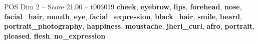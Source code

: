 \begin{textsample}{POS Dim 2 – Score 21.00 – t006019}  \label{ex:f2_pos_021}
\textbf{cheek}, \textbf{eyebrow}, \textbf{lips}, \textbf{forehead}, \textbf{nose}, \textbf{facial\_hair}, \textbf{mouth}, \textbf{eye}, \textbf{facial\_expression}, \textbf{black\_hair}, \textbf{smile}, \textbf{beard}, \textbf{portrait\_photography}, \textbf{happiness}, \textbf{moustache}, \textbf{jheri\_curl}, \textbf{afro}, \textbf{portrait}, \textbf{pleased}, \textbf{flesh}, \textbf{no\_expression}

\end{textsample}
